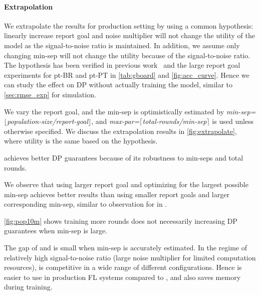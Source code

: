 

\paragraph{Extrapolation} We extrapolate the results for production setting by using a common hypothesis: linearly increase report goal and noise multiplier will not change the utility of the model as the signal-to-noise ratio is maintained. In addition, we assume only changing min-sep will not change the utility because of the signal-to-noise ratio. The hypothesis has been verified in previous work~\citep{kairouz21practical} and the large report goal experiments for pt-BR and pt-PT in \cref{tab:gboard} and \cref{fig:acc_curve}. Hence we can study the effect on DP without actually training the model, similar to \cref{sec:rmse_exp} for simulation.

We vary the report goal, and the min-sep is optimistically estimated by \emph{min-sep=$\lfloor$population-size/report-goal$\rfloor$}, and \emph{max-par=$\lceil$total-rounds/min-sep$\rceil$} is used unless otherwise specified. We discuss the extrapolation results in \cref{fig:extrapolate}, where utility is the same based on the hypothesis.
\begin{enumerate*}[label=\color{purple}(\arabic*)]
\item \blt achieves better DP guarantees because of its robustness to min-seps and total rounds. 
\item We observe that using larger report goal and optimizing for the largest possible min-sep achieves better results than using smaller report goals and larger corresponding min-sep, similar to observation for \treeagg in \citep{xu2023federated}.
\item \cref{fig:pop10m} shows training more rounds does not necessarily increasing DP guarantees when min-sep is large.
\item The gap of \blt and \bandmf is small when min-sep is accurately estimated. In the regime of relatively high signal-to-noise ratio (large noise multiplier for limited computation resources), \blt is competitive in a wide range of different configurations. Hence \blt is easier to use in production FL systems compared to \bandmf, and also saves memory during training.
\end{enumerate*}

